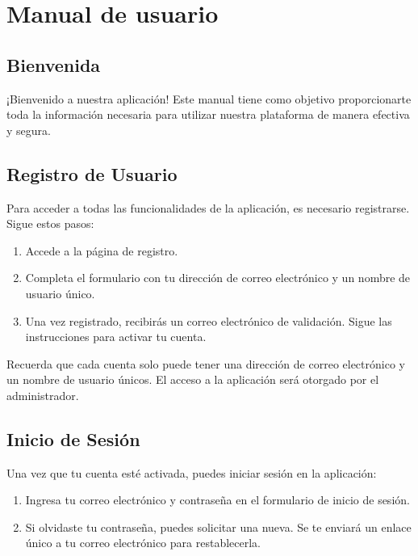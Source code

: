 \documentclass[a4paper, 12pt]{book}
\begin{document}
\cleardoublepage
\appendix
\chapter{Manual de usuario}
\label{app:manual}


\section{Bienvenida}
¡Bienvenido a nuestra aplicación! Este manual tiene como objetivo proporcionarte toda la información necesaria para utilizar nuestra 
plataforma de manera efectiva y segura.

\section{Registro de Usuario}

Para acceder a todas las funcionalidades de la aplicación, es necesario registrarse. Sigue estos pasos:

\begin{enumerate}
    \item Accede a la página de registro.
    \item Completa el formulario con tu dirección de correo electrónico y un nombre de usuario único.
    \item Una vez registrado, recibirás un correo electrónico de validación. Sigue las instrucciones para activar tu cuenta.
\end{enumerate}

Recuerda que cada cuenta solo puede tener una dirección de correo electrónico y un nombre de usuario únicos. El acceso a la aplicación 
será otorgado por el administrador.

\section{Inicio de Sesión}

Una vez que tu cuenta esté activada, puedes iniciar sesión en la aplicación:

\begin{enumerate}
    \item Ingresa tu correo electrónico y contraseña en el formulario de inicio de sesión.
    \item Si olvidaste tu contraseña, puedes solicitar una nueva. Se te enviará un enlace único a tu correo electrónico para 
    restablecerla.
\end{enumerate}
\end{document}
